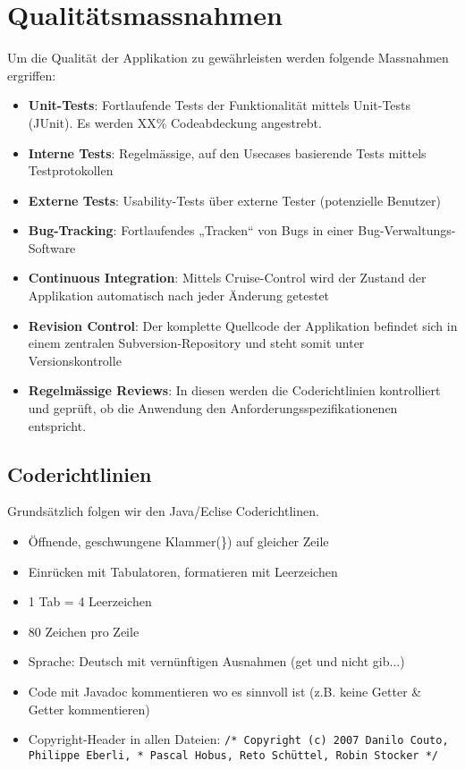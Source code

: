 \documentclass[a4paper,12pt,halfparskip,DIV14]{scrreprt}
\begin{document}
\section{Qualitätsmassnahmen}

Um die Qualität der Applikation zu gewährleisten werden folgende Massnahmen ergriffen:
\begin{itemize}
	\item \textbf{Unit-Tests}: Fortlaufende Tests der Funktionalität mittels Unit-Tests (JUnit). Es werden XX\% Codeabdeckung angestrebt.
	\item \textbf{Interne Tests}: Regelmässige, auf den Usecases basierende Tests mittels Testprotokollen
	\item \textbf{Externe Tests}: Usability-Tests über externe Tester (potenzielle Benutzer)
	\item \textbf{Bug-Tracking}: Fortlaufendes „Tracken“ von Bugs in einer Bug-Verwaltungs-Software
	\item \textbf{Continuous Integration}: Mittels Cruise-Control wird der Zustand der Applikation automatisch nach jeder Änderung getestet
	\item \textbf{Revision Control}: Der komplette Quellcode der Applikation befindet sich in einem zentralen Subversion-Repository und steht somit unter Versionskontrolle
	\item \textbf{Regelmässige Reviews}: In diesen werden die Coderichtlinien kontrolliert und geprüft, ob die Anwendung den Anforderungsspezifikationenen entspricht. 
\end{itemize}

\subsection{Coderichtlinien}\label{sub:coderichtlinien} %
Grundsätzlich folgen wir den Java/Eclise Coderichtlinen.
\begin{itemize}
  \item Öffnende, geschwungene Klammer(\}) auf gleicher Zeile
  \item Einrücken mit Tabulatoren, formatieren mit Leerzeichen
  \item 1 Tab = 4 Leerzeichen
  \item 80 Zeichen pro Zeile
  \item Sprache: Deutsch mit vernünftigen Ausnahmen (get und nicht gib...)
  \item Code mit Javadoc kommentieren wo es sinnvoll ist (z.B. keine Getter \& Getter kommentieren)
  \item Copyright-Header in allen Dateien: \texttt{/* Copyright (c) 2007 Danilo Couto, Philippe Eberli,
   *                    Pascal Hobus, Reto Schüttel, Robin Stocker
   */}
\end{itemize}
\end{document}

